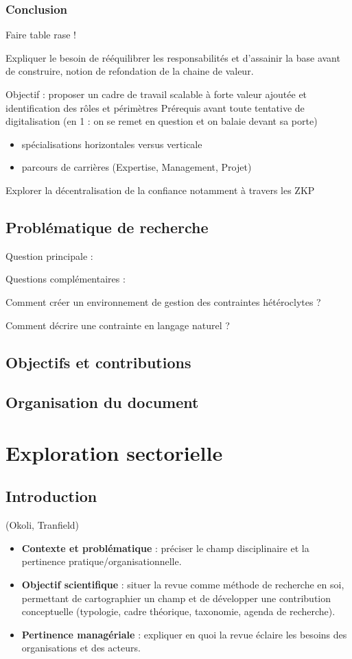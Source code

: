 \documentclass[a4paper,12pt]{article}
\begin{document}
\subsubsection{Conclusion}
\label{sec:orge933a51}
Faire table rase !


Expliquer le besoin de rééquilibrer les responsabilités et d'assainir la base avant de construire, notion de refondation de la chaine de valeur.

Objectif : proposer un cadre de travail scalable à forte valeur ajoutée et identification des rôles et périmètres 
Prérequis avant toute tentative de digitalisation (en 1 : on se remet en question et on balaie devant sa porte)
\begin{itemize}
\item spécialisations horizontales versus verticale
\item parcours de carrières (Expertise, Management, Projet)
\end{itemize}

Explorer la décentralisation de la confiance notamment à travers les ZKP
\subsection{Problématique de recherche}
\label{sec:orga55839d}
Question principale :

Questions complémentaires :

Comment créer un environnement de gestion des contraintes hétéroclytes ?

Comment décrire une contrainte en langage naturel ?
\subsection{Objectifs et contributions}
\label{sec:org1456414}

\subsection{Organisation du document}
\label{sec:orge2d4d4c}
\clearpage
\section{Exploration sectorielle}
\label{sec:org0ad814a}
\subsection{Introduction}
\label{sec:org6b76517}

(Okoli, Tranfield)
\begin{itemize}
\item \textbf{\textbf{Contexte et problématique}} : préciser le champ disciplinaire et la pertinence pratique/organisationnelle.
\item \textbf{\textbf{Objectif scientifique}} : situer la revue comme méthode de recherche en soi, permettant de cartographier un champ et de développer une contribution conceptuelle (typologie, cadre théorique, taxonomie, agenda de recherche).
\item \textbf{\textbf{Pertinence managériale}} : expliquer en quoi la revue éclaire les besoins des organisations et des acteurs.
\end{itemize}
\end{document}
